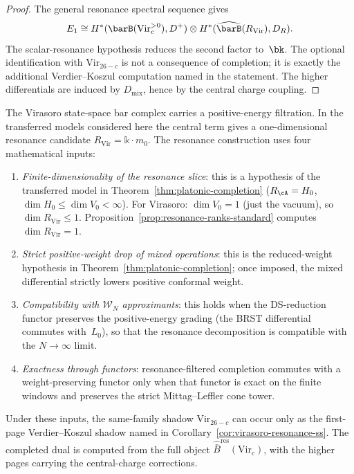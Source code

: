 \begin{proof}
The general resonance spectral sequence gives
\[
E_1\cong
H^*(\barB(\mathrm{Vir}_c^{>0}),D^+)\otimes
H^*(\widehat{\barB}(R_{\mathrm{Vir}}),D_R).
\]
The scalar-resonance hypothesis reduces the second factor to~$\bk$.
The optional identification with $\mathrm{Vir}_{26-c}$ is not a
consequence of completion; it is exactly the additional
Verdier--Koszul computation named in the statement.  The higher
differentials are induced by $D_{\mathrm{mix}}$, hence by the central
charge coupling.
\end{proof}

\begin{remark}
\label{rem:virasoro-resonance-model}
The Virasoro state-space bar complex carries a positive-energy
filtration.  In the transferred models considered here the central
term gives a one-dimensional resonance candidate
$R_{\mathrm{Vir}} = \mathbb{k} \cdot m_0$.  The resonance construction
uses four mathematical inputs:
\begin{enumerate}
\item \emph{Finite-dimensionality of the resonance slice}: this is a
 hypothesis of the transferred model in
 Theorem~\ref{thm:platonic-completion}
 \textup{(}$R_\cA = H_0$, $\dim H_0 \le \dim V_0 < \infty$\textup{)}.
 For Virasoro: $\dim V_0 = 1$ (just the vacuum), so
 $\dim R_{\mathrm{Vir}} \le 1$.
 Proposition~\ref{prop:resonance-ranks-standard} computes
 $\dim R_{\mathrm{Vir}} = 1$.
\item \emph{Strict positive-weight drop of mixed
 operations}: this is the reduced-weight hypothesis in
 Theorem~\ref{thm:platonic-completion}; once imposed, the mixed
 differential strictly lowers positive conformal weight.
\item \emph{Compatibility with $\mathcal{W}_N$
 approximants}: this holds when the DS-reduction functor preserves the
 positive-energy grading (the BRST differential commutes
 with~$L_0$), so that the resonance decomposition is compatible
 with the $N \to \infty$ limit.
\item \emph{Exactness through functors}: resonance-filtered completion
 commutes with a weight-preserving functor only when that functor is
 exact on the finite windows and preserves the strict
 Mittag--Leffler cone tower.
\end{enumerate}
Under these inputs, the same-family shadow $\mathrm{Vir}_{26-c}$ can
occur only as the first-page Verdier--Koszul shadow named in
Corollary~\ref{cor:virasoro-resonance-ss}.  The completed dual is
computed from the full object
$\widehat{\bar B}^{\mathrm{res}}(\mathrm{Vir}_c)$, with the higher
pages carrying the central-charge corrections.
\end{remark}

